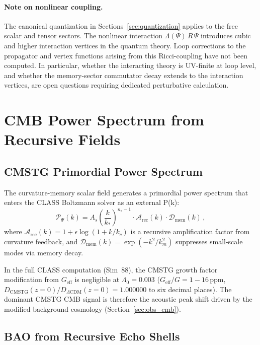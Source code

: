 \documentclass[12pt,a4paper]{article}
\begin{document}
\paragraph{Note on nonlinear coupling.}
The canonical quantization in Sections~\ref{sec:quantization} applies to the
free scalar and tensor sectors. The nonlinear interaction $\Lambda(\Psi)\,R\,\Psi$
introduces cubic and higher interaction vertices in the quantum theory.
Loop corrections to the propagator and vertex functions arising from this
Ricci-coupling have not been computed.  In particular, whether the interacting
theory is UV-finite at loop level, and whether the memory-sector commutator
decay extends to the interaction vertices, are open questions requiring
dedicated perturbative calculation.

\section{CMB Power Spectrum from Recursive Fields}
\label{sec:cmb}

\subsection{CMSTG Primordial Power Spectrum}

The curvature-memory scalar field generates a primordial power spectrum that enters the
CLASS Boltzmann solver as an external P(k):
\begin{equation}
\mathcal{P}_\Psi(k) = A_s\left(\frac{k}{k_*}\right)^{n_s-1}
\cdot \mathcal{A}_{\mathrm{rec}}(k) \cdot \mathcal{D}_{\mathrm{mem}}(k)\,,
\end{equation}
where $\mathcal{A}_{\mathrm{rec}}(k) = 1 + \epsilon\log(1 + k/k_c)$ is a
recursive amplification factor from curvature feedback, and
$\mathcal{D}_{\mathrm{mem}}(k) = \exp(-k^2/k_m^2)$ suppresses small-scale modes
via memory decay.

In the full CLASS computation (Sim~88), the CMSTG growth factor modification
from $G_{\mathrm{eff}}$ is negligible at $\Lambda_0 = 0.003$
($G_{\mathrm{eff}}/G = 1 - 16\,\mathrm{ppm}$,
$D_{\mathrm{CMSTG}}(z=0)/D_{\Lambda\mathrm{CDM}}(z=0) = 1.000000$
to six decimal places). The dominant CMSTG CMB signal is therefore the
acoustic peak shift driven by the modified background cosmology
(Section~\ref{sec:obs_cmb}).

\subsection{BAO from Recursive Echo Shells}
\label{sec:bao_theory}
\end{document}

